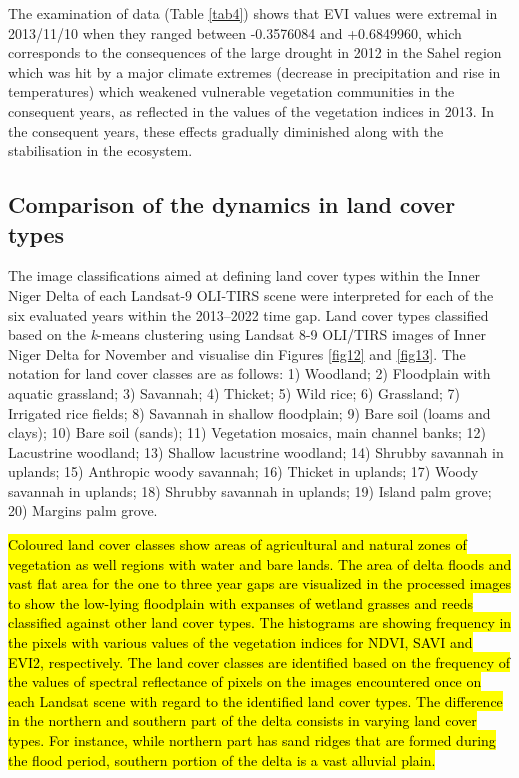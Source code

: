 \documentclass[12pt,a4paper,oneside]{article}
\def \newpar{\vspace{6pt}}
\begin{document}
\newpar The examination of data (Table \ref{tab4}) shows that EVI values were extremal in 2013/11/10 when they ranged between -0.3576084 and +0.6849960, which corresponds to the consequences of the large drought in 2012 in the Sahel region which was hit by a major climate extremes (decrease in precipitation and rise in temperatures) which weakened vulnerable vegetation communities in the consequent years, as reflected in the values of the vegetation indices in 2013. In the consequent years, these effects gradually diminished along with the stabilisation in the ecosystem.  

\subsection*{Comparison of the dynamics in land cover types}

\newpar The image classifications aimed at defining land cover types within the Inner Niger Delta of each Landsat-9 OLI-TIRS scene were interpreted for each of the six evaluated years within the 2013--2022 time gap. Land cover types classified based on the \emph{k}-means clustering using Landsat 8-9 OLI/TIRS images of Inner Niger Delta for November and visualise din Figures \ref{fig12} and \ref{fig13}. The notation for land cover classes are as follows: 1) Woodland; 2) Floodplain with aquatic grassland; 3) Savannah; 4) Thicket; 5) Wild rice; 6) Grassland; 7) Irrigated rice fields; 8) Savannah in shallow floodplain; 9) Bare soil (loams and clays); 10) Bare soil (sands); 11) Vegetation mosaics, main channel banks; 12) Lacustrine woodland; 13) Shallow lacustrine woodland; 14) Shrubby savannah in uplands; 15) Anthropic woody savannah; 16) Thicket in uplands; 17) Woody savannah in uplands; 18) Shrubby savannah in uplands; 19) Island palm grove; 20) Margins palm grove.

\newpar \hl{Coloured land cover classes show areas of agricultural and natural zones of vegetation as well regions with water and bare lands. The area of delta floods and vast flat area for the one to three year gaps are visualized in the processed images to show the low-lying floodplain with expanses of wetland grasses and reeds classified against other land cover types. The histograms are showing frequency in the pixels with various values of the vegetation indices for NDVI, SAVI and EVI2, respectively. The land cover classes are identified based on the frequency of the values of spectral reflectance of pixels on the images encountered once on each Landsat scene with regard to the identified land cover types. The difference in the northern and southern part of the delta consists in varying land cover types. For instance, while northern part has sand ridges that are formed during the flood period, southern portion of the delta is a vast alluvial plain.} 
\end{document}

